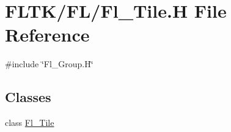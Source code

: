 \hypertarget{_fl___tile_8_h}{}\section{F\+L\+T\+K/\+F\+L/\+Fl\+\_\+\+Tile.H File Reference}
\label{_fl___tile_8_h}
{\ttfamily \#include \char`\"{}Fl\+\_\+\+Group.\+H\char`\"{}}\newline
\subsection*{Classes}
\begin{DoxyCompactItemize}
\item 
class \hyperlink{class_fl___tile}{Fl\+\_\+\+Tile}
\end{DoxyCompactItemize}
